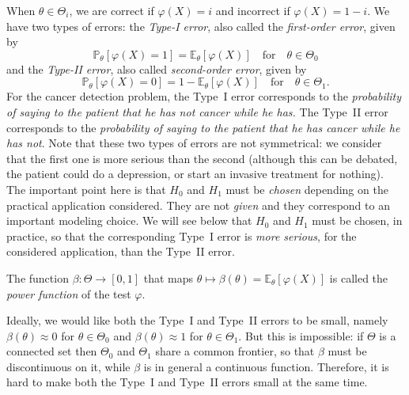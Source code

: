 \documentclass[
	fontsize=11pt, %
	twoside=false, %
	numbers=noenddot, %
]{kaobook}
\renewcommand{\P}{\mathbb P}
\newcommand{\E}{\mathbb E}
\newcommand{\goes}{\rightarrow}
\begin{document}
When $\theta \in \Theta_i$, we are correct if $\varphi(X) = i$ and incorrect if $\varphi(X) = 1 - i$.
We have two types of errors: the \emph{Type-I error}, also called the \emph{first-order error}, given by 
\begin{equation}
	\label{eq:type-1-error}
	\P_\theta[ \varphi(X) = 1] = \E_\theta [\varphi(X)] \quad \text{for} \quad
	\theta \in \Theta_0
\end{equation}
and the \emph{Type-II error}, also called \emph{second-order error}, given by 
\begin{equation}
	\label{eq:type-2-error}
	\P_\theta[ \varphi(X) = 0] = 1 - \E_\theta [\varphi(X)] \quad \text{for} \quad 
	\theta \in \Theta_1.
\end{equation}
For the cancer detection problem, the Type~I error corresponds to the \emph{probability of saying to the patient that he has not cancer while he has.}
The Type~II error corresponds to the \emph{probability of saying to the patient that he has cancer while he has not}.
Note that these two types of errors are not symmetrical: we consider that the first one is more serious than the second (although this can be debated, the patient could do a depression, or start an invasive treatment for nothing).%
The important point here is that $H_0$ and $H_1$ must be \emph{chosen} depending on the practical application considered. 
They are not \emph{given} and they correspond to an important modeling choice.
We will see below that $H_0$ and $H_1$ must be chosen, in practice, so that the corresponding Type~I error is \emph{more serious}, for the considered application, than the Type~II error.
\begin{definition}
	\label{def:power-function}
	The function $\beta : \Theta \goes [0, 1]$ that maps $\theta \mapsto \beta(\theta) = \E_\theta [\varphi(X)]$ is called the \emph{power function} of the test $\varphi$.
\end{definition}
Ideally, we would like both the Type~I and Type~II errors to be small, namely $\beta(\theta) \approx 0$ for $\theta \in \Theta_0$ and $\beta(\theta) \approx 1$ for $\theta \in \Theta_1$.
But this is impossible: if $\Theta$ is a connected set then $\Theta_0$ and $\Theta_1$ share a common frontier, so that $\beta$ must be discontinuous on it, while $\beta$ is in general a continuous function.
Therefore, it is hard to make both the Type~I and Type~II errors small at the same time.
\end{document}
